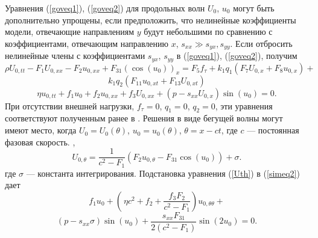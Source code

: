 Уравнения (\ref{goveq1}), (\ref{goveq2}) для продольных волн $U_0$, $u_0$ могут быть дополнительно упрощены, если предположить, что нелинейные коэффициенты модели, отвечающие направлениям $y$ будут небольшими по сравнению с коэффициентами, отвечающим направлению $x$, $s_{xx} \gg s_{yx}, s_{yy}$. Если отбросить нелинейные члены с коэффициентами $s_{yx}$, $s_{yy}$ в (\ref{goveq1}), (\ref{goveq2}), получим
\[
\rho U_{0,tt}-F_1 U_{0,xx}-F_2 u_{0,xx}+F_{31} ( \cos(u_0))_x= F_5 f_\tau+k_1 q_1 (F_7 U_{0,x}+F_8 u_{0,x})+
\]
\begin{equation}
	k_1 q_2 (F_{11} u_{0,xt}+ F_{13} U_{0,xt}) \label{simeq1}
\end{equation}
\begin{equation}
	\eta u_{0,tt}+f_1 u_0+f_2 u_{0,xx}+f_3 U_{0,xx}+(p-s_{xx} U_{0,x})\sin(u_0)=0.  \label{simeq2}
\end{equation}
При отсутствии внешней нагрузки, $f_\tau=0 $, $q_1 = 0$, $q_2 = 0$, эти уравнения соответствуют полученным ранее в \cite{bound_por14}. Решения в виде бегущей волны могут имеют место, когда $U_0 = U_0(\theta)$, $u_0 = u_0 (\theta)$, $\theta = x - c t$, где $c$ --- постоянная фазовая скорость. ,
\begin{equation}
	U_{0,\theta}=\frac{1}{c^2-F_1}\left(F_2 u_{0,\theta}-F_{31} \cos (u_0)\right)+\sigma. \label{Uth}
\end{equation}
где $\sigma$ --- константа интегрирования. Подстановка уравнения (\ref{Uth}) в (\ref{simeq2}) дает
\[
f_1 u_0+\left(\frac{}{}\eta c^2+ f_2+\frac{f_3 F_2}{c^2-F_1}\right) u_{0,\theta \theta}+ 
\]
\begin{equation}
	(p-s_{xx} \sigma)\sin(u_0)+\frac{s_{xx} F_{31}}{2(c^2-F_1)}\sin (2 u_0)=0. \label{simeq3}
\end{equation}
